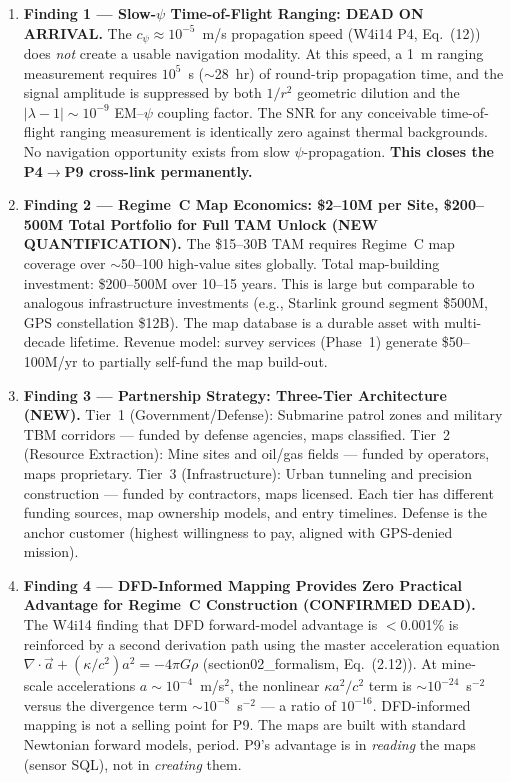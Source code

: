 \documentclass[11pt]{article}
\theoremstyle{definition}
\theoremstyle{remark}
\begin{document}
\begin{enumerate}
\item \textbf{Finding 1 --- Slow-$\psi$ Time-of-Flight Ranging: DEAD ON
  ARRIVAL.} The $c_\psi \approx 10^{-5}$~m/s propagation speed
  (W4i14 P4, Eq.~(12)) does \emph{not} create a usable navigation modality.
  At this speed, a 1~m ranging measurement requires $10^5$~s ($\sim$28~hr)
  of round-trip propagation time, and the signal amplitude is suppressed
  by both $1/r^2$ geometric dilution and the $|\lambda-1| \sim 10^{-9}$
  EM--$\psi$ coupling factor. The SNR for any conceivable time-of-flight
  ranging measurement is identically zero against thermal backgrounds.
  No navigation opportunity exists from slow $\psi$-propagation.
  \textbf{This closes the P4$\to$P9 cross-link permanently.}

\item \textbf{Finding 2 --- Regime~C Map Economics: \$2--10M per Site,
  \$200--500M Total Portfolio for Full TAM Unlock (NEW QUANTIFICATION).}
  The \$15--30B TAM requires Regime~C map coverage over $\sim$50--100
  high-value sites globally. Total map-building investment:
  \$200--500M over 10--15 years. This is large but comparable to analogous
  infrastructure investments (e.g., Starlink ground segment \$500M,
  GPS constellation \$12B). The map database is a durable asset with
  multi-decade lifetime. Revenue model: survey services (Phase~1)
  generate \$50--100M/yr to partially self-fund the map build-out.

\item \textbf{Finding 3 --- Partnership Strategy: Three-Tier Architecture
  (NEW).} Tier~1 (Government/Defense): Submarine patrol zones and
  military TBM corridors --- funded by defense agencies, maps classified.
  Tier~2 (Resource Extraction): Mine sites and oil/gas fields ---
  funded by operators, maps proprietary. Tier~3 (Infrastructure):
  Urban tunneling and precision construction --- funded by contractors,
  maps licensed. Each tier has different funding sources, map ownership
  models, and entry timelines. Defense is the anchor customer (highest
  willingness to pay, aligned with GPS-denied mission).

\item \textbf{Finding 4 --- DFD-Informed Mapping Provides Zero Practical
  Advantage for Regime~C Construction (CONFIRMED DEAD).} The W4i14
  finding that DFD forward-model advantage is $<$0.001\% is reinforced
  by a second derivation path using the master acceleration equation
  $\nabla\cdot\vec{a} + (\kappa/c^2)a^2 = -4\pi G\rho$
  (section02\_formalism, Eq.~(2.12)). At mine-scale accelerations
  $a \sim 10^{-4}$~m/s$^2$, the nonlinear $\kappa a^2/c^2$ term is
  $\sim 10^{-24}$~s$^{-2}$ versus the divergence term
  $\sim 10^{-8}$~s$^{-2}$ --- a ratio of $10^{-16}$. DFD-informed
  mapping is not a selling point for P9. The maps are built with
  standard Newtonian forward models, period. P9's advantage is in
  \emph{reading} the maps (sensor SQL), not in \emph{creating} them.


\end{enumerate}
\end{document}
